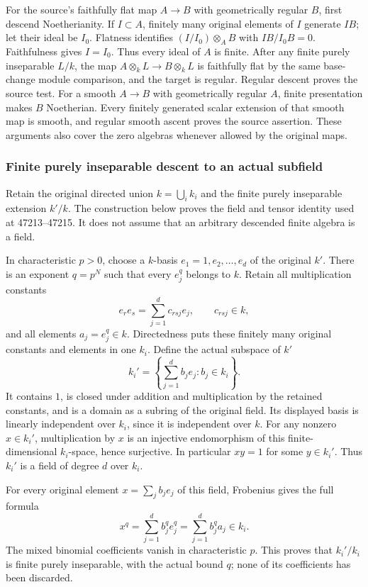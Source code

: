For the source's faithfully flat map \(A\to B\) with geometrically regular \(B\), first descend Noetherianity. If \(I\subset A\), finitely many original elements of \(I\) generate \(IB\); let their ideal be \(I_0\). Flatness identifies \((I/I_0)\otimes_AB\) with \(IB/I_0B=0\). Faithfulness gives \(I=I_0\). Thus every ideal of \(A\) is finite. After any finite purely inseparable \(L/k\), the map \(A\otimes_kL\to B\otimes_kL\) is faithfully flat by the same base-change module comparison, and the target is regular. Regular descent proves the source test. For a smooth \(A\to B\) with geometrically regular \(A\), finite presentation makes \(B\) Noetherian. Every finitely generated scalar extension of that smooth map is smooth, and regular smooth ascent proves the source assertion. These arguments also cover the zero algebras whenever allowed by the original maps.

\subsubsection{Finite purely inseparable descent to an actual subfield}\label{finite-purely-inseparable-descent-to-an-actual-subfield}

Retain the original directed union \(k=\bigcup_i k_i\) and the finite purely inseparable extension \(k'/k\). The construction below proves the field and tensor identity used at 47213--47215. It does not assume that an arbitrary descended finite algebra is a field.

In characteristic \(p>0\), choose a \(k\)-basis \(e_1=1,e_2,\ldots,e_d\) of the original \(k'\). There is an exponent \(q=p^N\) such that every \(e_j^q\) belongs to \(k\). Retain all multiplication constants \[
 e_re_s=\sum_{j=1}^d c_{rsj}e_j,\qquad c_{rsj}\in k,
\] and all elements \(a_j=e_j^q\in k\). Directedness puts these finitely many original constants and elements in one \(k_i\). Define the actual subspace of \(k'\) \[
 k_i'=\left\{\sum_{j=1}^d b_je_j:b_j\in k_i\right\}.
\] It contains \(1\), is closed under addition and multiplication by the retained constants, and is a domain as a subring of the original field. Its displayed basis is linearly independent over \(k_i\), since it is independent over \(k\). For any nonzero \(x\in k_i'\), multiplication by \(x\) is an injective endomorphism of this finite-dimensional \(k_i\)-space, hence surjective. In particular \(xy=1\) for some \(y\in k_i'\). Thus \(k_i'\) is a field of degree \(d\) over \(k_i\).

For every original element \(x=\sum_jb_je_j\) of this field, Frobenius gives the full formula \[
 x^q=\sum_{j=1}^d b_j^q e_j^q=\sum_{j=1}^d b_j^q a_j\in k_i.
\] The mixed binomial coefficients vanish in characteristic \(p\). This proves that \(k_i'/k_i\) is finite purely inseparable, with the actual bound \(q\); none of its coefficients has been discarded.

